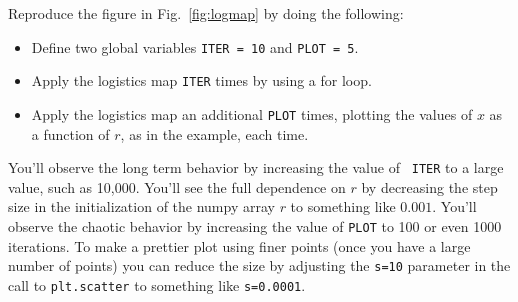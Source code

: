 \noindent
\begin{plot} \end{plot} Reproduce the figure in Fig.~\ref{fig:logmap} by doing the following:
\begin{itemize}
\item Define two global variables {\tt ITER = 10} and {\tt PLOT = 5}.
\item Apply the logistics map {\tt ITER} times by using a for loop.
\item Apply the logistics map an additional {\tt PLOT} times, plotting the values of $x$ as a function of $r$, as in the example, each time.
\end{itemize}
You'll observe the long term behavior by increasing the value of {\tt
  ITER} to a large value, such as 10,000.  You'll see the full
dependence on $r$ by decreasing the step size in the initialization of
the numpy array $r$ to something like $0.001$.  You'll observe the
chaotic behavior by increasing the value of {\tt PLOT} to 100 or even
1000 iterations.  To make a prettier plot using finer points (once you
have a large number of points) you can reduce the size by adjusting
the {\tt s=10} parameter in the call to {\tt plt.scatter} to something
like {\tt s=0.0001}.

